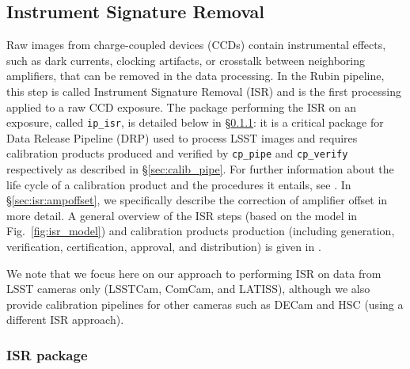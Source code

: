 \subsection{Instrument Signature Removal}
\label{sec:isr}

Raw images from charge-coupled devices (CCDs) contain instrumental effects, such as dark currents, clocking artifacts, or crosstalk between neighboring amplifiers, that can be removed in the data processing.
In the Rubin pipeline, this step is called Instrument Signature Removal (ISR) and is the first processing applied to a raw CCD exposure.
The package performing the ISR on an exposure, called \texttt{ip\_isr}, is detailed below in \S\ref{sec:ip_isr}: it is a critical package for Data Release Pipeline (DRP) used to process LSST images and requires calibration products produced and verified by \texttt{cp\_pipe} and \texttt{cp\_verify} respectively as described in \S\ref{sec:calib_pipe}. For further information about the life cycle of a calibration product and the procedures it entails, see \citet{DMTN-222}. In \S\ref{sec:isr:ampoffset}, we specifically describe the correction of amplifier offset in more detail.
A general overview of the ISR steps (based on the model in Fig.~\ref{fig:isr_model}) and calibration products production (including generation, verification, certification, approval, and distribution) is given in \citet{2024arXiv240414516P}.

We note that we focus here on our approach to performing ISR on data from LSST cameras only (LSSTCam, ComCam, and LATISS), although we also provide calibration pipelines for other cameras such as DECam and HSC (using a different ISR approach).

\subsubsection{ISR package}
\label{sec:ip_isr}

